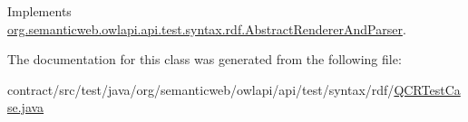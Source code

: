 Implements \hyperlink{classorg_1_1semanticweb_1_1owlapi_1_1api_1_1test_1_1syntax_1_1rdf_1_1_abstract_renderer_and_parser_a6eb3d4cdc99bab1338cfad6899390e9f}{org.\-semanticweb.\-owlapi.\-api.\-test.\-syntax.\-rdf.\-Abstract\-Renderer\-And\-Parser}.



The documentation for this class was generated from the following file\-:\begin{DoxyCompactItemize}
\item 
contract/src/test/java/org/semanticweb/owlapi/api/test/syntax/rdf/\hyperlink{_q_c_r_test_case_8java}{Q\-C\-R\-Test\-Case.\-java}\end{DoxyCompactItemize}
